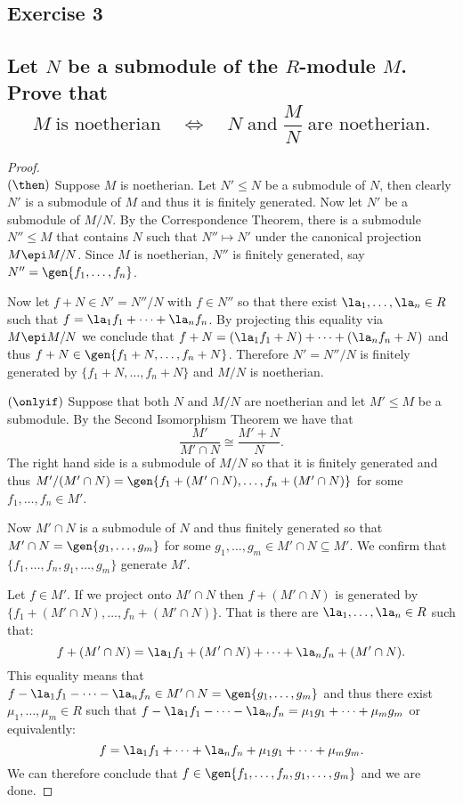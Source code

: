 \HRule
\subsection*{Exercise 3}
\subsection*{%
Let $N$ be a submodule of the $R$-module $M$. Prove that
\[
	M \; \text{is noetherian} \quad\iff\quad N \;\text{and}\; \frac{M}{N} \; \text{are noetherian}.
\]
} 

\begin{proof} $\;$\\ %
$(\then)$ Suppose $M$ is noetherian. Let $N'\leq N$ be a submodule of $N$, then clearly $N'$ is a submodule
of $M$ and thus it is finitely generated. Now let $N'$ be a submodule of $M/N$. By the Correspondence Theorem,
there is a submodule $N''\leq M$ that contains $N$ such that $N''\mapsto N'$ under the canonical projection
$M\epi M/N$. Since $M$ is noetherian, $N''$ is finitely generated, say $N''=\gen{f_1,\ldots,f_n}$.

Now let $f+N\in N'=N''/N$ with $f\in N''$ so that there exist $\la_1,\ldots,\la_n\in R$ such that
$f=\la_1 f_1+\cdots +\la_n f_n$. By projecting this equality via $M\epi M/N$ we conclude that
$f+N=(\la_1 f_1+N)+\cdots +(\la_n f_n+N)$ and thus $f+N\in \gen{f_1+N,\ldots,f_n+N}$. Therefore $N'=N''/N$
is finitely generated by $\{f_1+N,\ldots,f_n+N\}$ and $M/N$ is noetherian.

$(\onlyif)$ Suppose that both $N$ and $M/N$ are noetherian and let $M'\leq M$ be a submodule. By the Second
Isomorphism Theorem we have that
\[
	\frac{M'}{M'\cap N}\cong\frac{M'+N}{N}.
\]
The right hand side is a submodule of $M/N$ so that it is finitely generated and thus
$M'/(M'\cap N)=\gen{f_1+(M'\cap N),\ldots,f_n+(M'\cap N)}$ for some $f_1,\ldots,f_n\in M'$.

Now $M'\cap N$ is a submodule of $N$ and thus finitely generated so that $M'\cap N=\gen{g_1,\ldots,g_m}$ for
some $g_1,\ldots,g_m\in M'\cap N\subseteq M'$. We confirm that $\{f_1,\ldots,f_n,g_1,\ldots,g_m\}$ generate
$M'$.

Let $f\in M'$. If we project onto $M'\cap N$ then $f+(M'\cap N)$ is generated by $\{f_1+(M'\cap N),\ldots,f_n+(M'\cap N)\}$.
That is there are $\la_1,\ldots,\la_n\in R$ such that:
\[
	f+(M'\cap N)=\la_1 f_1+(M'\cap N) +\cdots + \la_n f_n+(M'\cap N).
\]
This equality means that $f-\la_1f_1-\cdots -\la_nf_n\in M'\cap N=\gen{g_1,\ldots,g_m}$ and thus there exist
$\mu_1,\ldots,\mu_m\in R$ such that $f-\la_1f_1-\cdots-\la_nf_n=\mu_1g_1+\cdots+\mu_m g_m$ or equivalently:
\[
	f=\la_1f_1+\cdots+\la_nf_n+\mu_1g_1+\cdots+\mu_m g_m.
\]
We can therefore conclude that $f\in\gen{f_1,\ldots,f_n,g_1,\ldots,g_m}$ and we are done.
%
\end{proof}%


